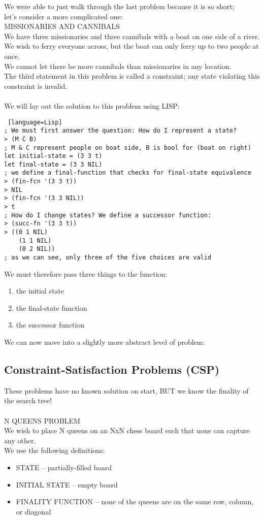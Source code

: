 \documentclass[../../lecture_notes.tex]{subfiles}
\begin{document}
\noindent We were able to just walk through the last problem because it is so short; \\
	let’s consider a more complicated one:\\

\noindent MISSIONARIES AND CANNIBALS\\
\indent We have three missionaries and three cannibals with a boat on one side of a river.\\
\indent We wish to ferry everyone across, but the boat can only ferry up to two people at once.\\
\indent We cannot let there be more cannibals than missionaries in any location.\\
The third statement in this problem is called a constraint; any state violating this constraint is invalid.\\
\\
We will lay out the solution to this problem using LISP:
\begin{lstlisting} [language=Lisp]
; We must first answer the question: How do I represent a state?
> (M C B)
; M & C represent people on boat side, B is bool for (boat on right)
let initial-state = (3 3 t) 
let final-state = (3 3 NIL) 
; we define a final-function that checks for final-state equivalence
> (fin-fcn '(3 3 t))
> NIL
> (fin-fcn '(3 3 NIL))
> t
; How do I change states? We define a successor function:
> (succ-fn '(3 3 t))
> ((0 1 NIL)
    (1 1 NIL)
    (0 2 NIL))
; as we can see, only three of the five choices are valid
\end{lstlisting}
\noindent We must therefore pass three things to the function:
\begin{enumerate} [itemsep=0mm]
\item the initial state
\item the final-state function
\item the successor function
\end{enumerate}
We can now move into a slightly more abstract level of problem:\\
\subsection*{Constraint-Satisfaction Problems (CSP)}
\noindent These problems have no known solution on start, BUT we know the finality of the search tree!\\
\\
N QUEENS PROBLEM\\
\indent We wish to place N queens on an NxN chess board such that none can capture any other.\\
\indent We use the following definitions:\\
\begin{itemize} [itemsep=0mm]
\item STATE -- partially-filled board
\item INITIAL STATE -- empty board
\item FINALITY FUNCTION -- none of the queens are on the same row, column, or diagonal
\end{itemize}
\end{document}
